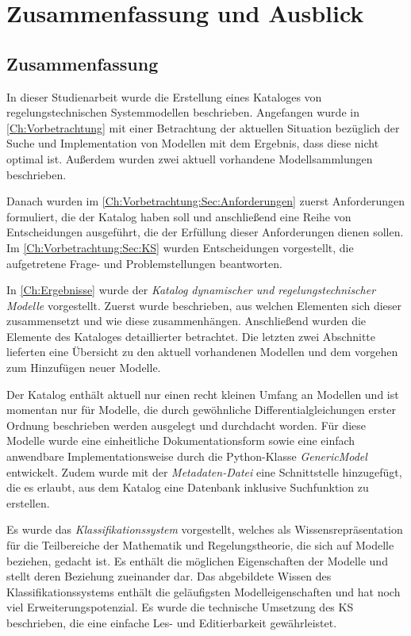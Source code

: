 \chapter{Zusammenfassung und Ausblick}
\label{Ch:ZsmfsgAusblick}
\section{Zusammenfassung}
\label{Ch:ZsmfsgAusblick:Sec:Zsmfsg} 
In dieser Studienarbeit wurde die Erstellung eines Kataloges von regelungstechnischen Systemmodellen beschrieben. Angefangen wurde in \autoref{Ch:Vorbetrachtung} mit einer Betrachtung der aktuellen Situation bezüglich der Suche und Implementation von Modellen mit dem Ergebnis, dass diese nicht optimal ist. Außerdem wurden zwei aktuell vorhandene Modellsammlungen beschrieben. 

Danach wurden im \autoref{Ch:Vorbetrachtung:Sec:Anforderungen} zuerst Anforderungen formuliert, die der Katalog haben soll und anschließend eine Reihe von Entscheidungen ausgeführt, die der Erfüllung dieser Anforderungen dienen sollen. Im \autoref{Ch:Vorbetrachtung:Sec:KS} wurden Entscheidungen vorgestellt, die aufgetretene Frage- und Problemstellungen beantworten.

In \autoref{Ch:Ergebnisse} wurde der \textit{Katalog dynamischer und regelungstechnischer Modelle} vorgestellt. Zuerst wurde beschrieben, aus welchen Elementen sich dieser zusammensetzt und wie diese zusammenhängen. Anschließend wurden die Elemente des Kataloges detaillierter betrachtet. Die letzten zwei Abschnitte lieferten eine Übersicht zu den aktuell vorhandenen Modellen und dem vorgehen zum Hinzufügen neuer Modelle.

Der Katalog enthält aktuell nur einen recht kleinen Umfang an Modellen und ist momentan nur für Modelle, die durch gewöhnliche Differentialgleichungen erster Ordnung beschrieben werden ausgelegt und durchdacht worden. Für diese Modelle wurde eine einheitliche Dokumentationsform sowie eine einfach anwendbare Implementationsweise durch die Python-Klasse \textit{GenericModel} entwickelt. Zudem wurde mit der \textit{Metadaten-Datei} eine Schnittstelle hinzugefügt, die es erlaubt, aus dem Katalog eine Datenbank inklusive Suchfunktion zu erstellen. 

Es wurde das \textit{Klassifikationssystem} vorgestellt, welches als Wissensrepräsentation für die Teilbereiche der Mathematik und Regelungstheorie, die sich auf Modelle beziehen, gedacht ist. Es enthält die möglichen Eigenschaften der Modelle und stellt deren Beziehung zueinander dar. Das abgebildete Wissen des Klassifikationssystems enthält die geläufigsten Modelleigenschaften und hat noch viel Erweiterungspotenzial. Es wurde die technische Umsetzung des KS beschrieben, die eine einfache Les- und Editierbarkeit gewährleistet. 

